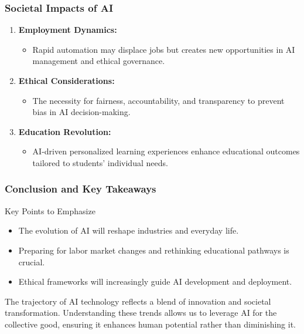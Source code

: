 \documentclass[aspectratio=169]{beamer}
\begin{document}
\begin{frame}[fragile]
    \frametitle{Societal Impacts of AI}
    \begin{enumerate}
        \item \textbf{Employment Dynamics:}
            \begin{itemize}
                \item Rapid automation may displace jobs but creates new opportunities in AI management and ethical governance.
            \end{itemize}
        
        \item \textbf{Ethical Considerations:}
            \begin{itemize}
                \item The necessity for fairness, accountability, and transparency to prevent bias in AI decision-making.
            \end{itemize}
        
        \item \textbf{Education Revolution:}
            \begin{itemize}
                \item AI-driven personalized learning experiences enhance educational outcomes tailored to students' individual needs.
            \end{itemize}
    \end{enumerate}
\end{frame}

\begin{frame}[fragile]
    \frametitle{Conclusion and Key Takeaways}
    \begin{block}{Key Points to Emphasize}
        \begin{itemize}
            \item The evolution of AI will reshape industries and everyday life.
            \item Preparing for labor market changes and rethinking educational pathways is crucial.
            \item Ethical frameworks will increasingly guide AI development and deployment.
        \end{itemize}
    \end{block}
    
    The trajectory of AI technology reflects a blend of innovation and societal transformation. Understanding these trends allows us to leverage AI for the collective good, ensuring it enhances human potential rather than diminishing it.
\end{frame}
\end{document}
